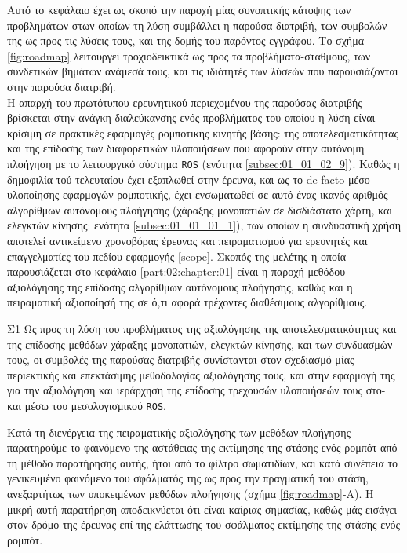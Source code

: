 Αυτό το κεφάλαιο έχει ως σκοπό την παροχή μίας συνοπτικής κάτοψης των
προβλημάτων στων οποίων τη λύση συμβάλλει η παρούσα διατριβή, των συμβολών της
ως προς τις λύσεις τους, και της δομής του παρόντος εγγράφου. Το σχήμα
\ref{fig:roadmap} λειτουργεί τροχιοδεικτικά ως προς τα προβλήματα-σταθμούς, των
συνδετικών βημάτων ανάμεσά τους, και τις ιδιότητές των λύσεών που παρουσιάζονται
στην παρούσα διατριβή.\\

Η απαρχή του πρωτότυπου ερευνητικού περιεχομένου της παρούσας διατριβής
βρίσκεται στην ανάγκη διαλεύκανσης ενός προβλήματος του οποίου η λύση είναι
κρίσιμη σε πρακτικές εφαρμογές ρομποτικής κινητής βάσης: της
αποτελεσματικότητας και της επίδοσης των διαφορετικών υλοποιήσεων που αφορούν
στην αυτόνομη πλοήγηση με το λειτουργικό σύστημα \texttt{ROS} (ενότητα
\ref{subsec:01_01_02_9}). Καθώς η δημοφιλία τού τελευταίου έχει εξαπλωθεί στην
έρευνα, και ως το de facto μέσο υλοποίησης εφαρμογών ρομποτικής, έχει
ενσωματωθεί σε αυτό ένας ικανός αριθμός αλγορίθμων αυτόνομους πλοήγησης
(χάραξης μονοπατιών σε δισδιάστατο χάρτη, και ελεγκτών κίνησης: ενότητα
\ref{subsec:01_01_01_1}), των οποίων η συνδυαστική χρήση αποτελεί αντικείμενο
χρονοβόρας έρευνας και πειραματισμού για ερευνητές και επαγγελματίες του πεδίου
εφαρμογής \ref{scope}. Σκοπός της μελέτης η οποία παρουσιάζεται στο κεφάλαιο
\ref{part:02:chapter:01} είναι η παροχή μεθόδου αξιολόγησης της επίδοσης
αλγορίθμων αυτόνομους πλοήγησης, καθώς και η πειραματική αξιοποίησή της σε ό,τι
αφορά τρέχοντες διαθέσιμους αλγορίθμους.

\begin{bw_box}
\begin{customcontribution}{Σ1}
  Ως προς τη λύση του προβλήματος της αξιολόγησης της αποτελεσματικότητας και
  της επίδοσης μεθόδων χάραξης μονοπατιών, ελεγκτών κίνησης, και των συνδυασμών
  τους, οι συμβολές της παρούσας διατριβής συνίστανται στον σχεδιασμό μίας
  περιεκτικής και επεκτάσιμης μεθοδολογίας αξιολόγησής τους, και στην εφαρμογή
  της για την αξιολόγηση και ιεράρχηση της επίδοσης τρεχουσών υλοποιήσεών τους
  στο- και μέσω του μεσολογισμικού \texttt{ROS}.
\end{customcontribution}
\end{bw_box}

Κατά τη διενέργεια της πειραματικής αξιολόγησης των μεθόδων πλοήγησης
παρατηρούμε το φαινόμενο της αστάθειας της εκτίμησης της στάσης ενός ρομπότ από
τη μέθοδο παρατήρησης αυτής, ήτοι από το φίλτρο σωματιδίων, και κατά συνέπεια
το γενικευμένο φαινόμενο του σφάλματός της ως προς την πραγματική του στάση,
ανεξαρτήτως των υποκειμένων μεθόδων πλοήγησης (σχήμα \ref{fig:roadmap}-Α). Η
μικρή αυτή παρατήρηση αποδεικνύεται ότι είναι καίριας σημασίας, καθώς μάς
εισάγει στον δρόμο της έρευνας επί της ελάττωσης του σφάλματος εκτίμησης της
στάσης ενός ρομπότ.\\

